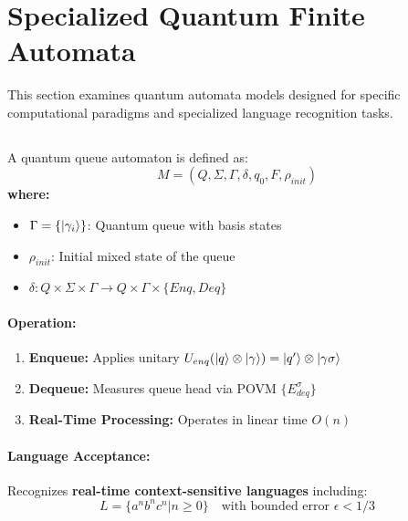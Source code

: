 \section{Specialized Quantum Finite Automata}
\label{sec:specialized-qfa}

This section examines quantum automata models designed for specific computational paradigms and specialized language recognition tasks.

\subsection{}
\label{subsec:qqa}

\begin{definition}
A quantum queue automaton is defined as:
\[
M = (Q, \Sigma, \Gamma, \delta, q_0, F, \rho_{init})
\]
\textbf{where:}
\begin{itemize}
    \item $\Gamma = \{\ket{\gamma_i}\}$: Quantum queue with basis states
    \item $\rho_{init}$: Initial mixed state of the queue
    \item $\delta: Q \times \Sigma \times \Gamma \rightarrow Q \times \Gamma \times \{Enq, Deq\}$
\end{itemize}
\end{definition}

\paragraph{Operation:}
\begin{enumerate}
    \item \textbf{Enqueue:} Applies unitary $U_{enq}(\ket{q}\otimes\ket{\gamma}) = \ket{q'}\otimes\ket{\gamma\sigma}$
    \item \textbf{Dequeue:} Measures queue head via POVM $\{E_{deq}^\sigma\}$
    \item \textbf{Real-Time Processing:} Operates in linear time $O(n)$ \cite{yakaryilmaz2010succinctness}
\end{enumerate}

\paragraph{Language Acceptance:}
Recognizes \textbf{real-time context-sensitive languages} including:
\[
L = \{a^nb^nc^n | n \geq 0\} \quad \text{with bounded error } \epsilon < 1/3
\]

